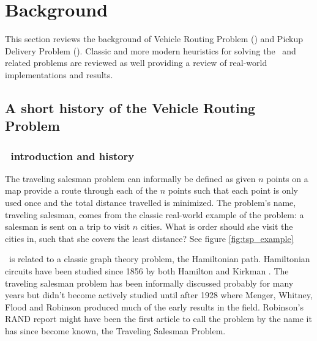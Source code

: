 
\chapter{Background}
This section reviews the background of Vehicle Routing Problem (\VRP) and Pickup Delivery Problem (\PDP). Classic and more modern heuristics for solving the \VRP\ and related problems are reviewed as well providing a review of real-world implementations and results. 

\section{A short history of the Vehicle Routing Problem}

\subsection{\TSP\ introduction and history}
The traveling salesman problem can informally be defined as given $n$ points on a map provide a route through each of the $n$ points such that each point is only used once and the total distance travelled is minimized. The problem's name, traveling salesman, comes from the classic real-world example of the problem: a salesman is sent on a trip to visit $n$ cities. What is order should she visit the cities in, such that she covers the least distance? See figure \ref{fig:tsp_example}


\TSP\ is related to a classic graph theory problem, the Hamiltonian path. Hamiltonian circuits have been studied since 1856 by both Hamilton \cite{Hamilton:1856} and Kirkman \cite{Kirkman:1856}. The traveling salesman problem has been informally discussed probably for many years \cite{Schrijver} but didn't become actively studied until after 1928 where Menger, Whitney, Flood and Robinson produced much of the early results in the field. Robinson's RAND report \cite{Robinson:1949} might have been the first article to call the problem by the name it has since become known, the Traveling Salesman Problem.  


